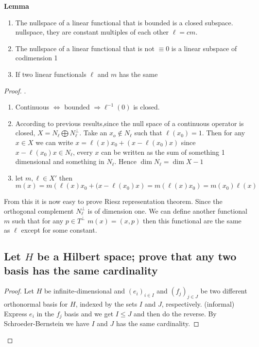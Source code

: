 \documentclass[titlepage]{article}
\begin{document}
\textbf{Lemma}
\begin{enumerate}
\item The nullspace of a linear functional that is bounded is a closed subspace.
nullspace, they are constant multiples of each other $\ell = cm$.
\item The nullspace of a linear functional that is not $\equiv 0$ is a linear subspace of codimension 1
\item If two linear functionals $\ell$ and $m$ has the same 
\end{enumerate}
\begin{proof}
.

\begin{enumerate}
\item  Continuous $\Longleftrightarrow$ bounded $\Longrightarrow \ell ^{-1}(0)$ is closed.
\item According to previous results,since the null space of a continuous operator is closed, $X = N_\ell\bigoplus N_\ell^\perp$.
Take an $x_o\not\in N_\ell$ such that $\ell(x_0) = 1$.
Then for any $x\in X$ we can write $x = \ell(x)x_0 + (x - \ell(x_0)x)$
since $x - \ell(x_0)x \in  N_\ell$, every $x$ can be written as the sum of something 1 dimensional and something in $N_\ell$. Hence $\dim N_\ell = \dim X - 1$ 

\item let $m,\ell \in X'$ then $m(x) = m\left(\ell(x)x_0 + (x - \ell(x_0)x\right) = m(\ell(x)x_0) = m(x_0)\ell(x)$


\end{enumerate}
From this it is now easy to prove Riesz representation theorem.
Since the orthogonal complement $N_\ell^\perp$ is of dimension one. We can define another functional $m$ such that for any  $p \in T^\perp$ $m(x) = (x,p)$ then this functional are the same as $\ell$ except for some constant.

\subsection{Let $H$ be a Hilbert space; prove that any two basis has the same cardinality}
\begin{proof}
Let $H$ be infinite-dimensional and $(e_i)_{i\in I}$ and $(f_j)_{j\in J}$ be two different orthonormal basis for $H$, indexed by the sets $I$ and $J$, respectively.
(informal) Express $e_i$ in the $f_j$ basis and we get $I \leq J$ and then do the reverse. By Schroeder-Bernstein we have $I$ and $J$ has the same cardinality.
\end{proof}


\end{proof}
\end{document}
